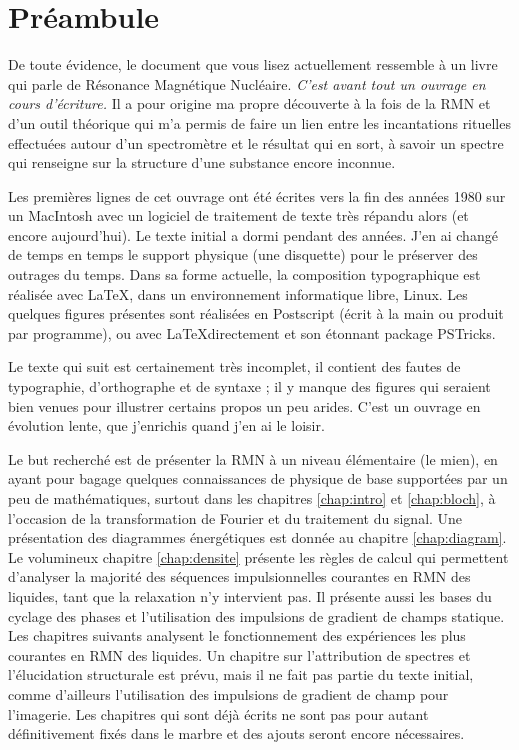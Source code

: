 \chapter{Préambule}

De toute évidence, le document que vous lisez actuellement ressemble à un livre
qui parle de Résonance Magnétique Nucléaire.
\emph{C'est avant tout un ouvrage en cours d'écriture.}
Il a pour origine ma propre découverte à la fois de la RMN et d'un outil théorique
qui m'a permis de faire un lien entre les incantations rituelles 
effectuées autour d'un spectromètre et le résultat qui en sort, 
à savoir un spectre qui renseigne sur la structure d'une substance encore inconnue.

Les premières lignes de cet ouvrage ont été écrites vers la fin des années 1980
sur un MacIntosh avec un logiciel de traitement de texte très répandu alors
(et encore aujourd'hui).
Le texte initial a dormi pendant des années. 
J'en ai changé de temps en temps le support
physique (une disquette) pour le préserver des outrages du temps.
Dans sa forme actuelle, la composition typographique est réalisée avec \LaTeX,
dans un environnement informatique libre, Linux. 
Les quelques figures présentes sont réalisées 
en Postscript (écrit à la main ou produit par programme), 
ou avec \LaTeX directement et son étonnant package PSTricks.

Le texte qui suit est certainement très incomplet, il contient des fautes
de typographie, d'orthographe et de syntaxe ; il y manque des figures qui seraient
bien venues pour illustrer certains propos un peu arides.
C'est un ouvrage en évolution lente, que j'enrichis quand j'en ai le loisir.

Le but recherché est de présenter la RMN à un niveau élémentaire (le mien),
en ayant pour bagage quelques connaissances de physique de base supportées par 
un peu de mathématiques, surtout dans les chapitres \ref{chap:intro} et \ref{chap:bloch}, 
à l'occasion de la transformation de Fourier et du traitement du signal.
Une présentation des diagrammes énergétiques est donnée au chapitre \ref{chap:diagram}.
Le volumineux chapitre \ref{chap:densite} présente les règles de calcul qui permettent d'analyser
la majorité des séquences impulsionnelles courantes en RMN des liquides, 
tant que la relaxation n'y intervient pas.
Il présente aussi les bases du cyclage des phases et l'utilisation des
impulsions de gradient de champs statique.
Les chapitres suivants analysent le fonctionnement des expériences les plus
courantes en RMN des liquides.
Un chapitre sur l'attribution de spectres et l'élucidation structurale est prévu,
mais il ne fait pas partie du texte initial, comme d'ailleurs l'utilisation
des impulsions de gradient de champ pour l'imagerie.
Les chapitres qui sont déjà écrits ne sont pas pour autant définitivement fixés
dans le marbre et des ajouts seront encore nécessaires.

